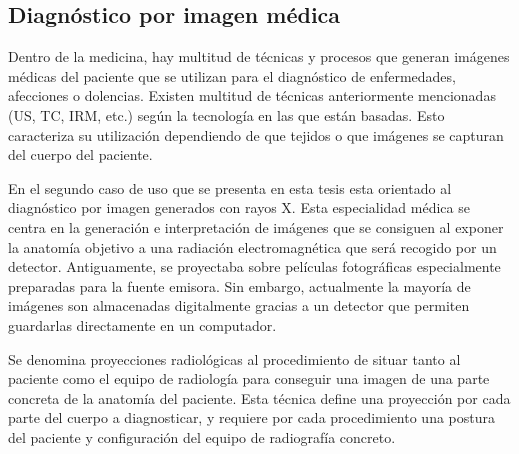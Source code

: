 \subsection{Diagnóstico por imagen médica}
\label{art:xraysim}

Dentro de la medicina, hay multitud de técnicas y procesos que generan imágenes médicas del paciente que se utilizan para el diagnóstico de enfermedades, afecciones o dolencias. Existen multitud de técnicas anteriormente mencionadas (\ac{US}, \ac{TC}, \ac{IRM}, etc.) según la tecnología en las que están basadas. Esto caracteriza su utilización dependiendo de que tejidos o que imágenes se capturan del cuerpo del paciente. 

En el segundo caso de uso que se presenta en esta tesis esta orientado al diagnóstico por imagen generados con rayos X. Esta especialidad médica se centra en la generación e interpretación de imágenes que se consiguen al exponer la anatomía objetivo a una radiación electromagnética que será recogido por un detector. Antiguamente, se proyectaba sobre películas fotográficas especialmente preparadas para la fuente emisora. Sin embargo, actualmente la mayoría de imágenes son almacenadas digitalmente gracias a un detector que permiten guardarlas directamente en un computador.

Se denomina proyecciones radiológicas al procedimiento de situar tanto al paciente como el equipo de radiología para conseguir una imagen de una parte concreta de la anatomía del paciente. Esta técnica define una proyección por cada parte del cuerpo a diagnosticar, y requiere por cada procedimiento una postura del paciente y configuración del equipo de radiografía concreto.

